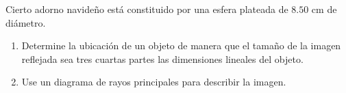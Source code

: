 \item Cierto adorno navideño está constituido por una esfera plateada de $8.50\text{ cm}$ de diámetro.
\begin{enumerate}
    \item Determine la ubicación de un objeto de manera que el tamaño de la imagen reflejada sea tres cuartas partes las dimensiones lineales del objeto.
    \item Use un diagrama de rayos principales para describir la imagen.
\end{enumerate}